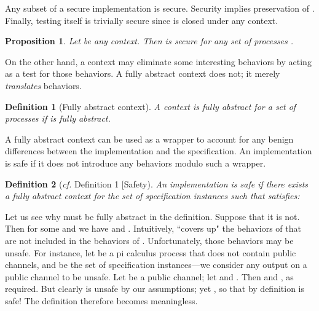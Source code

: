 \documentclass[10pt]{article}
\newtheorem{definition}{Definition}
\newtheorem{proposition}[theorem]{Proposition}
\begin{document}
Any subset of a secure implementation is secure. Security implies preservation of . 
Finally, testing itself is trivially secure since  is closed under any context.
\begin{proposition}\label{trivprop} Let  be any context. Then  is secure for any set of processes .
\end{proposition}
\noindent
On the other hand, a context may eliminate some interesting behaviors by acting as a test for those behaviors. A fully abstract context does not; it merely \emph{translates} behaviors. 
\begin{definition}[Fully abstract context] A context  is fully abstract for a set of processes  if  is fully abstract.
\end{definition}
\noindent
A fully abstract context can be used as a wrapper to account for any benign differences between the implementation and the specification. An implementation is safe if it does not introduce any behaviors modulo such a wrapper.
\begin{definition}[\emph{cf.} Definition 1 [Safety]\label{safetydef} An implementation  is safe if there exists a fully abstract context  for the set of specification instances such that  satisfies:
\end{definition}
\noindent
Let us see why  must be fully abstract in the definition. Suppose that it is not. Then for some  and  we have  and . Intuitively,  ``covers up" the behaviors of  that are not included in the behaviors of . 
Unfortunately, those behaviors may be unsafe. For instance, let  be a pi calculus process \cite{polypi} that does not contain public channels, and  be the set of specification instances---we consider any output on a public channel to be unsafe. Let  be a public channel; let  and . Then  and , as required. But clearly  is unsafe by our assumptions; yet , so that by definition  is safe! The definition therefore becomes meaningless. 
\end{document}
